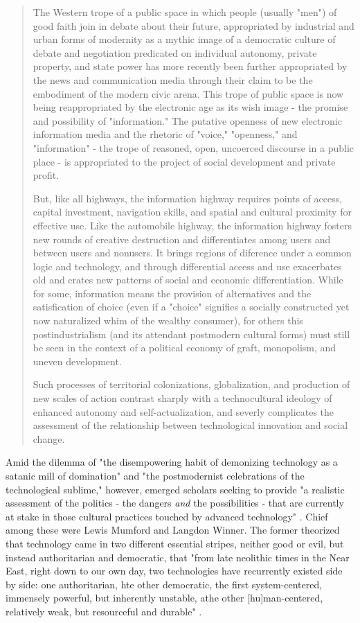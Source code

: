 \blockquote{The Western trope of a public space in which people (usually "men") of good faith join in debate about their future, appropriated by industrial and urban forms of modernity as a mythic image of a democratic culture of debate and negotiation predicated on individual autonomy, private property, and state power has more recently been further appropriated by the news and communication media through their claim to be the embodiment of the modern civic arena. This trope of public space is now being reappropriated by the electronic age as its wish image - the promise and possibility of "information." The putative openness of new electronic information media and the rhetoric of "voice," "openness," and "information" - the trope of reasoned, open, uncoerced discourse in a public place - is appropriated to the project of social development and private profit.

But, like all highways, the information highway requires points of access, capital investment, navigation skills, and spatial and cultural proximity for effective use. Like the automobile highway, the information highway fosters new rounds of creative destruction and differentiates among users and between users and nonusers. It brings regions of diference under a common logic and technology, and through differential access and use exacerbates old and crates new patterns of social and economic differentiation. While for some, information means the provision of alternatives and the satisfication of choice (even if a "choice" signifies a socially constructed yet now naturalized whim of the wealthy consumer), for others this postindustrialism (and its attendant postmodern cultural forms) must still be seen in the context of a political economy of graft, monopolism, and uneven development.

Such processes of territorial colonizations, globalization, and production of new scales of action contrast sharply with a technocultural ideology of enhanced autonomy and self-actualization, and severly complicates the assessment of the relationship between technological innovation and social change.}

Amid the dilemma of "the disempowering habit of demonizing technology as a satanic mill of domination" and "the postmodernist celebrations of the technological sublime," however, emerged scholars seeking to provide "a realistic assessment of the politics - the dangers \textit{and} the possibilities - that are currently at stake in those cultural practices touched by advanced technology"  \cite{penleyTechnoculture1991}. Chief among these were Lewis Mumford and Langdon Winner. The former theorized that technology came in two different essential stripes, neither good or evil, but instead authoritarian and democratic, that "from late neolithic times in the Near East, right down to our own day, two technologies have recurrently existed side by side: one authoritarian, hte other democratic, the first system-centered, immensely powerful, but inherently unstable, athe other [hu]man-centered, relatively weak, but resourceful and durable" \cite{mumfordAuthoritarianDemocraticTechnics1964}. 

